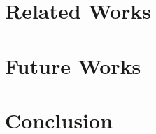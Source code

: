\documentclass[10pt,sigconf,letterpaper,anonymous,nonacm]{acmart}
\begin{document}

\section{Related Works}

\section{Future Works}

\section{Conclusion}



\end{document}

